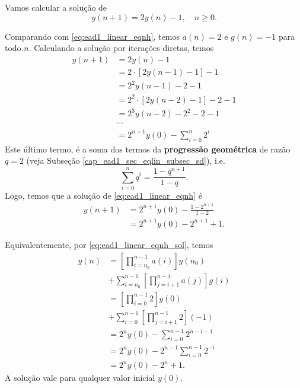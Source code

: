 \begin{ex}
  Vamos calcular a solução de
  \begin{equation}\label{eq:ex_ead1_lin_enh}
    y(n+1) = 2y(n) - 1,\quad n\geq 0.
  \end{equation}

  Comparando com \eqref{eq:ead1_linear_eqnh}, temos $a(n) = 2$ e $g(n)=-1$ para todo $n$. Calculando a solução por iterações diretas, temos
  \begin{align}
    y(n+1) &= 2y(n)-1 \\
            &= 2\cdot \left[2y(n-1)-1\right]-1 \\
            &= 2^2y(n-1)-2-1 \\
            &= 2^2\cdot \left[2y(n-2)-1\right]-2-1 \\
            &= 2^3y(n-2)-2^2-2-1 \\
            &\cdots \\
            &= 2^{n+1}y(0)-\sum_{i=0}^{n}2^i
  \end{align}
  Este último termo, é a soma dos termos da {\bf progressão geométrica} de razão $q=2$ (veja Subseção \ref{cap_ead1_sec_eqlin_subsec_sd}), i.e.
  \begin{equation}
    \sum_{i=0}^n q^i = \frac{1-q^{n+1}}{1-q}.
  \end{equation}
  Logo, temos que a solução de \eqref{eq:ead1_linear_eqnh} é
  \begin{align}
    y(n+1) &= 2^{n+1}y(0) - \frac{1-2^{n+1}}{1-2} \\
           &= 2^{n+1}y(0) -2^{n+1}+1.
  \end{align}
  
  Equivalentemente, por \eqref{eq:ead1_linear_eqnh_sol}, temos
  \begin{align}
    y(n) &= \left[\prod_{i=n_0}^{n-1} a(i)\right]y(n_0) \\
         &+ \sum_{i=n_0}^{n-1}\left[\prod_{j=i+1}^{n-1} a(j)\right]g(i) \\
         &= \left[\prod_{i=0}^{n-1} 2\right]y(0) \\
         &+ \sum_{i=0}^{n-1}\left[\prod_{j=i+1}^{n-1} 2\right](-1) \\
         &= 2^ny(0) - \sum_{i=0}^{n-1}2^{n-i-1}\\
         &= 2^ny(0) - 2^{n-1}\sum_{i=0}^{n-1}2^{-i}\\
         &= 2^ny(0) - 2^{n} + 1. \label{eq:ex_ead1_linear_eqnh_sol}
  \end{align}
  A solução vale para qualquer valor inicial $y(0)$.


\end{ex}
